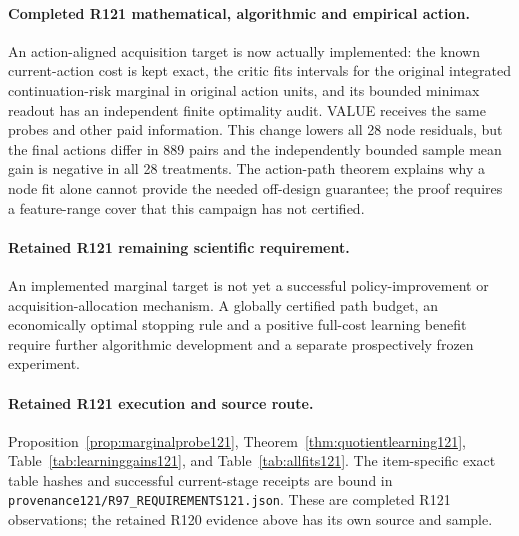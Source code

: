 \paragraph{Completed R121 mathematical, algorithmic and empirical action.}
An action-aligned acquisition target is now actually implemented: the known current-action cost is kept exact, the critic fits intervals for the original integrated continuation-risk marginal in original action units, and its bounded minimax readout has an independent finite optimality audit. VALUE receives the same probes and other paid information. This change lowers all 28 node residuals, but the final actions differ in 889 pairs and the independently bounded sample mean gain is negative in all 28 treatments. The action-path theorem explains why a node fit alone cannot provide the needed off-design guarantee; the proof requires a feature-range cover that this campaign has not certified.

\paragraph{Retained R121 remaining scientific requirement.}
An implemented marginal target is not yet a successful policy-improvement or acquisition-allocation mechanism. A globally certified path budget, an economically optimal stopping rule and a positive full-cost learning benefit require further algorithmic development and a separate prospectively frozen experiment.

\paragraph{Retained R121 execution and source route.}
Proposition~\ref{prop:marginalprobe121}, Theorem~\ref{thm:quotientlearning121}, Table~\ref{tab:learninggains121}, and Table~\ref{tab:allfits121}.
The item-specific exact table hashes and successful current-stage receipts are bound in \nolinkurl{provenance121/R97_REQUIREMENTS121.json}. These are completed R121 observations; the retained R120 evidence above has its own source and sample.

